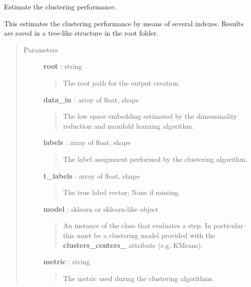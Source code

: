 \documentclass[letterpaper,10pt,english]{sphinxmanual}
\begin{document}
\begin{fulllineitems}
\label{index:adenine.core.analyze_results.est_clst_perf}
Estimate the clustering performance.

This estimates the clustering performance by means of several indexes.
Results are saved in a tree-like structure in the root folder.
\begin{quote}\begin{description}
\item[{Parameters}] \leavevmode
\textbf{root} : string
\begin{quote}

The root path for the output creation.
\end{quote}

\textbf{data\_in} : array of float, shape
\begin{quote}

The low space embedding estimated by the dimensinality reduction and
manifold learning algorithm.
\end{quote}

\textbf{labels} : array of float, shape
\begin{quote}

The label assignment performed by the clustering algorithm.
\end{quote}

\textbf{t\_labels} : array of float, shape
\begin{quote}

The true label vector; None if missing.
\end{quote}

\textbf{model} : sklearn or sklearn-like object
\begin{quote}

An instance of the class that evaluates a step. In particular this must
be a clustering model provided with the {\color{red}\bfseries{}clusters\_centers\_} attribute
(e.g. KMeans).
\end{quote}

\textbf{metric} : string
\begin{quote}

The metric used during the clustering algorithms.
\end{quote}

\end{description}\end{quote}

\end{fulllineitems}
\end{document}
